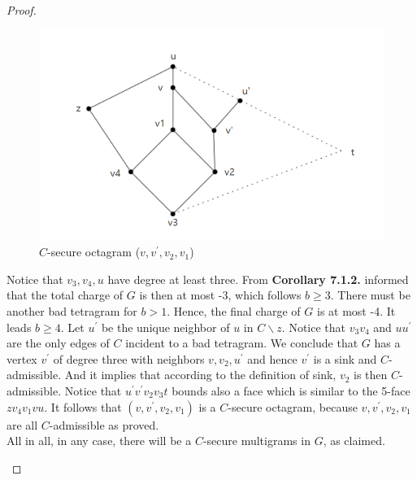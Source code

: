 \begin{proof}
\begin{itemize}
\begin{itemize}
        \begin{figure}[H] %
            \centering %
            \includegraphics[width=0.7 \textwidth]{figure/temp.png} 
            \caption{$C$-secure octagram ($v, v^{'}, v_2, v_1$)} %
            \label{figure} %
        \end{figure}
        Notice that $v_3, v_4, u$ have degree at least three. From \textbf{Corollary 7.1.2.} informed that the total charge of $G$ is then at most -3, which follows $b \geq 3$. There must be another bad tetragram for $b > 1$. Hence, the final charge of $G$ is at most -4. It leads $b \geq 4$. Let $u^{'}$ be the unique neighbor of $u$ in $C \backslash z$. Notice that $v_3v_4$ and $uu^{'}$ are the only edges of $C$ 
       incident to a bad tetragram. We conclude that $G$ has a vertex $v^{'}$ of degree three with neighbors $v, v_2, u^{'}$ and hence $v^{'}$ is a sink and $C$-admissible. And it implies that according to the definition of sink, $v_2$ is then $C$-admissible. Notice that $u^{'}v^{'}v_2v_3t$ bounds also a face which is similar to the 5-face $zv_4v_1vu$. It follows that $(v, v^{'}, v_2, v_1)$ is a $C$-secure octagram, because $v, v^{'}, v_2, v_1$ are all $C$-admissible as proved.\\
        All in all, in any case, there will be a $C$-secure multigrams in $G$, as claimed.

    \end{itemize}
\end{itemize}
\end{proof}


